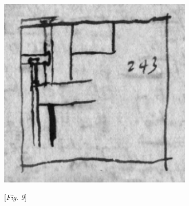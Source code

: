 \count{}
\count{}
\pstart
\begin{minipage}[t]{0.5\textwidth}
\hspace*{-5mm}
\includegraphics[width=0.7\textwidth]{images/LH035,14,02_119v_Ausschnitt.pdf}\\
\rule[-4mm]{0mm}{10mm}\noindent\centering\hspace*{-12mm}[\textit{Fig. 9}]
\end{minipage}
\hspace*{-5mm}
